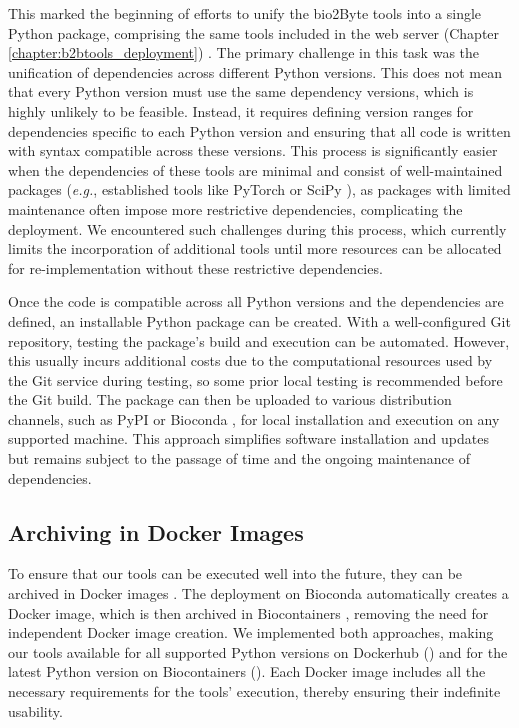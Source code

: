This marked the beginning of efforts to unify the bio2Byte tools into a single Python package, comprising the same tools included in the web server (Chapter \ref{chapter:b2btools_deployment}) \cite{gavalda-garcia_bio2byte_2024}. The primary challenge in this task was the unification of dependencies across different Python versions. This does not mean that every Python version must use the same dependency versions, which is highly unlikely to be feasible. Instead, it requires defining version ranges for dependencies specific to each Python version and ensuring that all code is written with syntax compatible across these versions. This process is significantly easier when the dependencies of these tools are minimal and consist of well-maintained packages (\textit{e.g.}, established tools like PyTorch \cite{paszke_pytorch_2019} or SciPy \cite{mckinney-proc-scipy-2010}), as packages with limited maintenance often impose more restrictive dependencies, complicating the deployment. We encountered such challenges during this process, which currently limits the incorporation of additional tools until more resources can be allocated for re-implementation without these restrictive dependencies.

Once the code is compatible across all Python versions and the dependencies are defined, an installable Python package can be created. With a well-configured Git repository, testing the package's build and execution can be automated. However, this usually incurs additional costs due to the computational resources used by the Git service during testing, so some prior local testing is recommended before the Git build. The package can then be uploaded to various distribution channels, such as PyPI \cite{pypi} or Bioconda \cite{gruning_bioconda_2018}, for local installation and execution on any supported machine. This approach simplifies software installation and updates but remains subject to the passage of time and the ongoing maintenance of dependencies.


\subsection{Archiving in Docker Images}

To ensure that our tools can be executed well into the future, they can be archived in Docker images \cite{merkel2014docker}. The deployment on Bioconda automatically creates a Docker image, which is then archived in Biocontainers \cite{da_veiga_leprevost_biocontainers_2017}, removing the need for independent Docker image creation. We implemented both approaches, making our tools available for all supported Python versions on Dockerhub () and for the latest Python version on Biocontainers (). Each Docker image includes all the necessary requirements for the tools' execution, thereby ensuring their indefinite usability.



